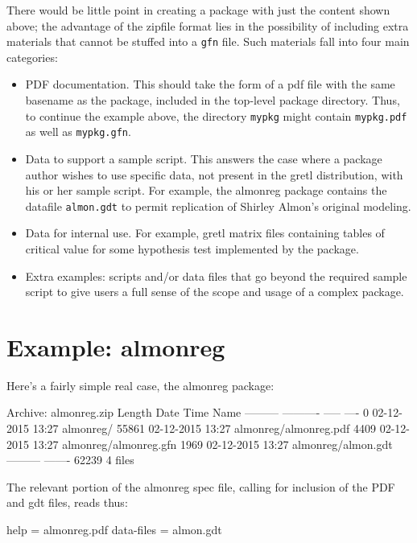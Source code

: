 \documentclass[oneside]{book}
\begin{document}
There would be little point in creating a package with just the
content shown above; the advantage of the zipfile format lies in the
possibility of including extra materials that cannot be stuffed into
a \texttt{gfn} file. Such materials fall into four main categories:

\begin{itemize}
\item PDF documentation. This should take the form of a pdf file with
  the same basename as the package, included in the top-level package
  directory. Thus, to continue the example above, the directory
  \texttt{mypkg} might contain \texttt{mypkg.pdf} as well as
  \texttt{mypkg.gfn}.
\item Data to support a sample script. This answers the case where a
  package author wishes to use specific data, not present in the gretl
  distribution, with his or her sample script. For example, the
  \textsf{almonreg} package contains the datafile \texttt{almon.gdt}
  to permit replication of Shirley Almon's original modeling.
\item Data for internal use. For example, gretl matrix files
  containing tables of critical value for some hypothesis test
  implemented by the package.
\item Extra examples: scripts and/or data files that go beyond the
  required sample script to give users a full sense of the scope and
  usage of a complex package.
\end{itemize}

\section{Example: \textsf{almonreg}}

Here's a fairly simple real case, the \textsf{almonreg} package:

\begin{code}
Archive:  almonreg.zip
  Length      Date    Time    Name
---------  ---------- -----   ----
        0  02-12-2015 13:27   almonreg/
    55861  02-12-2015 13:27   almonreg/almonreg.pdf
     4409  02-12-2015 13:27   almonreg/almonreg.gfn
     1969  02-12-2015 13:27   almonreg/almon.gdt
---------                     -------
    62239                     4 files
\end{code}

The relevant portion of the \textsf{almonreg} spec file, calling for
inclusion of the PDF and gdt files, reads thus:

\begin{code}
help = almonreg.pdf
data-files = almon.gdt
\end{code}
\end{document}
